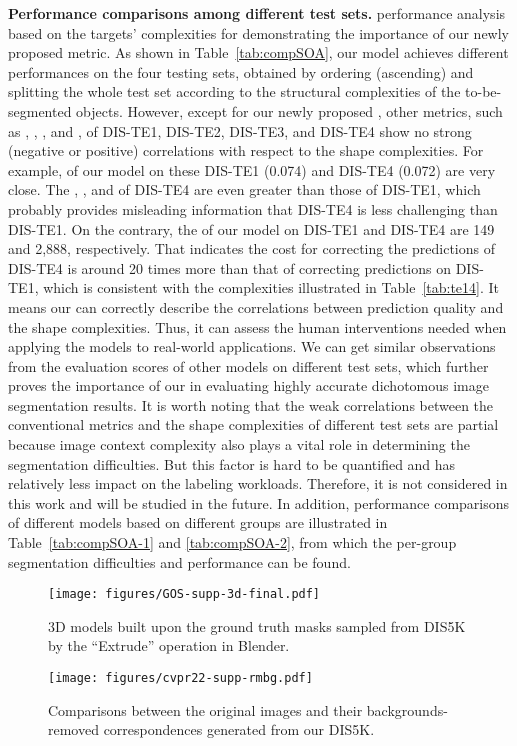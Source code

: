 \documentclass[10pt,twocolumn,letterpaper]{article}
\begin{document}
\noindent 
\textbf{Performance comparisons among different test sets.} 
performance analysis based on the targets' complexities for demonstrating the importance of our newly proposed  metric. 
As shown in Table~\ref{tab:compSOA}, our model achieves different performances on the four testing sets, obtained by ordering (ascending) and splitting the whole test set according to the structural complexities of the to-be-segmented objects. 
However, except for our newly proposed , other metrics, such as , , ,  and , of DIS-TE1, DIS-TE2, DIS-TE3, and DIS-TE4 show no strong (negative or positive) correlations with respect to the shape complexities. 
For example,  of our model on these DIS-TE1 (0.074) and DIS-TE4 (0.072) are very close. The , ,  and  of DIS-TE4 are even greater than those of DIS-TE1, which probably provides misleading information that DIS-TE4 is less challenging than DIS-TE1. 
On the contrary, the  of our model on DIS-TE1 and DIS-TE4 are 149 and 2,888, respectively. 
That indicates the cost for correcting the predictions of DIS-TE4 is around 20 times more than that of correcting predictions on DIS-TE1, which is consistent with the complexities illustrated in Table~\ref{tab:te14}. 
It means our  can correctly describe the correlations between prediction quality and the shape complexities. 
Thus, it can assess the human interventions needed when applying the models to real-world applications. 
We can get similar observations from the evaluation scores of other models on different test sets, which further proves the importance of our  in evaluating highly accurate dichotomous image segmentation results. 
It is worth noting that the weak correlations between the conventional metrics and the shape complexities of different test sets are partial because image context complexity also plays a vital role in determining the segmentation difficulties. 
But this factor is hard to be quantified and has relatively less impact on the labeling workloads. 
Therefore, it is not considered in this work and will be studied in the future. 
In addition, performance comparisons of different models based on different groups are illustrated in Table~\ref{tab:compSOA-1} and \ref{tab:compSOA-2}, from which the per-group segmentation difficulties and performance can be found.   

\begin{figure*}[thbp]
    \centering
    \texttt{[image: figures/GOS-supp-3d-final.pdf]}
\caption{\small 3D models built upon the ground truth masks sampled from DIS5K by the ``Extrude'' operation in Blender.}
    \label{fig:DIS-3d}
\end{figure*}
\begin{figure*}[thbp]
    \centering
    \texttt{[image: figures/cvpr22-supp-rmbg.pdf]}
\caption{\small Comparisons between the original images and their backgrounds-removed correspondences generated from our DIS5K.}
    \label{fig:tm_rmbg}
\end{figure*}
\end{document}
